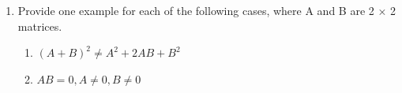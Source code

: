 \documentclass[]{book}
\theoremstyle{definition}
\newtheorem*{soln}{Solution}
\begin{document}
\begin{enumerate}
\begin{soln}
	When $\lambda$ = 14,
	$$(A- \lambda I) \boldsymbol{x}  = \left( {\begin{matrix}
	-1 & 5 \\ 
	2 & -10
	\end{matrix} }\right) \boldsymbol{x} = 0 $$
	$$\boldsymbol{x} = \left({\begin{matrix}
		5 & 1
		\end{matrix} }\right) ^ T $$
	When $\lambda$ = 3,
	$$(A- \lambda I) \boldsymbol{x}  = \left( {\begin{matrix}
		10 & 5 \\ 
		2 & 1
		\end{matrix} }\right) \boldsymbol{x} = 0 $$
	$$\boldsymbol{x} = \left({\begin{matrix}
		1 & -2
		\end{matrix} }\right) ^ T $$
	
	In summary, A has two eigenvalues, $\lambda_1 = 14$, $\lambda_2 = 3$. The corresponding eigenvectors are $\boldsymbol{x_1} = \left({\begin{matrix}
		5 & 1
		\end{matrix} }\right) ^ T $ and $\boldsymbol{x_2} = \left({\begin{matrix}
		1 & -2
		\end{matrix} }\right) ^ T $.
	
\end{soln}

\item	Provide one example for each of the following cases, where A and B are 2 × 2 matrices.
\begin{enumerate}
	\item  $(A + B)^2 \neq A^2 + 2AB + B^2$
	\item  $AB = 0, A \neq 0, B \neq 0$
\end{enumerate}


\end{enumerate}
\end{document}
